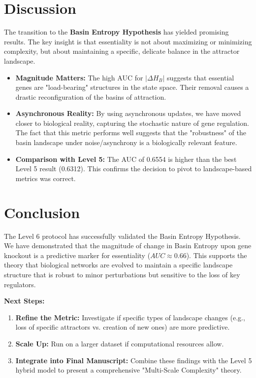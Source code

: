 \documentclass{article}
\begin{document}
\section{Discussion}
The transition to the \textbf{Basin Entropy Hypothesis} has yielded promising results. The key insight is that essentiality is not about maximizing or minimizing complexity, but about maintaining a specific, delicate balance in the attractor landscape.

\begin{itemize}
    \item \textbf{Magnitude Matters:} The high AUC for $|\Delta H_B|$ suggests that essential genes are "load-bearing" structures in the state space. Their removal causes a drastic reconfiguration of the basins of attraction.
    \item \textbf{Asynchronous Reality:} By using asynchronous updates, we have moved closer to biological reality, capturing the stochastic nature of gene regulation. The fact that this metric performs well suggests that the "robustness" of the basin landscape under noise/asynchrony is a biologically relevant feature.
    \item \textbf{Comparison with Level 5:} The AUC of 0.6554 is higher than the best Level 5 result (0.6312). This confirms the decision to pivot to landscape-based metrics was correct.
\end{itemize}

\section{Conclusion}
The Level 6 protocol has successfully validated the Basin Entropy Hypothesis. We have demonstrated that the magnitude of change in Basin Entropy upon gene knockout is a predictive marker for essentiality ($AUC \approx 0.66$). This supports the theory that biological networks are evolved to maintain a specific landscape structure that is robust to minor perturbations but sensitive to the loss of key regulators.

\textbf{Next Steps:}
\begin{enumerate}
    \item \textbf{Refine the Metric:} Investigate if specific types of landscape changes (e.g., loss of specific attractors vs. creation of new ones) are more predictive.
    \item \textbf{Scale Up:} Run on a larger dataset if computational resources allow.
    \item \textbf{Integrate into Final Manuscript:} Combine these findings with the Level 5 hybrid model to present a comprehensive "Multi-Scale Complexity" theory.
\end{enumerate}
\end{document}
